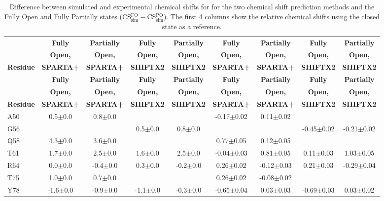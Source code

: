 \documentclass[%
 aip,
 amsmath,amssymb,
 preprint,%
]{revtex4-1}
\newcommand{\ca}{\ce{C_\alpha} }
\begin{document}
\begingroup
\begin{center}
\begin{longtable}{l|c|c|c|c|c|c|c|c}
\caption{\scriptsize Difference between simulated and experimental chemical shifts for \ca for the two chemical shift prediction methods and the Fully Open and Fully Partially states (CS$_\text{sim}^\text{FO}-$CS$_\text{sim}^\text{PO}$). The first 4 columns show the relative chemical shifts using the closed state as a reference.  \label{SI_tb_DDCS_CA}}\\ 
\hline 
\hline 
& \textbf{Fully} & \textbf{Partially} & \textbf{Fully} & \textbf{Partially} & \textbf{Fully} & \textbf{Partially} & \textbf{Fully} & \textbf{Partially} \\
& \textbf{Open,} & \textbf{Open,} & \textbf{Open,} & \textbf{Open,} & \textbf{Open,} & \textbf{Open,} & \textbf{Open,} & \textbf{Open,}\\
\textbf{Residue} & \textbf{SPARTA+} & \textbf{SPARTA+} & \textbf{SHIFTX2} & \textbf{SHIFTX2} & \textbf{SPARTA+} & \textbf{SPARTA+} & \textbf{SHIFTX2} & \textbf{SHIFTX2} \\
\hline
\endfirsthead 
\hline
& \textbf{Fully} & \textbf{Partially} & \textbf{Fully} & \textbf{Partially} & \textbf{Fully} & \textbf{Partially} & \textbf{Fully} & \textbf{Partially} \\
& \textbf{Open,} & \textbf{Open,} & \textbf{Open,} & \textbf{Open,} & \textbf{Open,} & \textbf{Open,} & \textbf{Open,} & \textbf{Open,}\\
\textbf{Residue} & \textbf{SPARTA+} & \textbf{SPARTA+} & \textbf{SHIFTX2} & \textbf{SHIFTX2} & \textbf{SPARTA+} & \textbf{SPARTA+} & \textbf{SHIFTX2} & \textbf{SHIFTX2}  \\ \hline
\endhead
A50 & 0.5$\pm$0.0 & 0.8$\pm$0.0 & & & -0.17$\pm$0.02 & 0.11$\pm$0.02 & & \\
G56 & & & 0.5$\pm$0.0 & 0.8$\pm$0.0 & & & -0.45$\pm$0.02 & -0.21$\pm$0.02 \\
Q58 & 4.3$\pm$0.0 & 3.6$\pm$0.0 & & & 0.77$\pm$0.05 & 0.12$\pm$0.05 & & \\
T61 & 1.7$\pm$0.0 & 2.5$\pm$0.0 & 1.6$\pm$0.0 & 2.5$\pm$0.0 & -0.04$\pm$0.03 & 0.81$\pm$0.05 & 0.11$\pm$0.03 & 1.03$\pm$0.05 \\
R64 & 0.0$\pm$0.0 & -0.4$\pm$0.0 & 0.3$\pm$0.0 & -0.2$\pm$0.0 & 0.26$\pm$0.02 & -0.12$\pm$0.03 & 0.21$\pm$0.03 & -0.29$\pm$0.04 \\
T75 & 1.0$\pm$0.0 & 0.7$\pm$0.0 & & & 0.26$\pm$0.02 & -0.08$\pm$0.02 & & \\
Y78 & -1.6$\pm$0.0 & -0.9$\pm$0.0 & -1.1$\pm$0.0 & -0.3$\pm$0.0 & -0.65$\pm$0.04 & 0.03$\pm$0.03 & -0.69$\pm$0.03 & 0.03$\pm$0.02 \\

\end{longtable}
\end{center}
\end{document}
